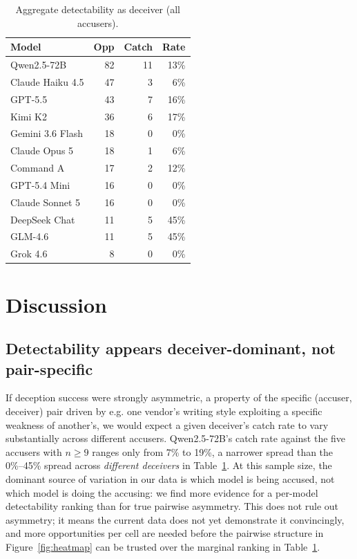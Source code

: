 \documentclass{article}
\begin{document}
\begin{table}[t]
\centering
\caption{Aggregate detectability as deceiver (all accusers).}
\label{tab:aggregate}
\begin{tabular}{@{}lrrr@{}}
\toprule
Model & Opp & Catch & Rate \\
\midrule
Qwen2.5-72B      & 82 & 11 & 13\% \\
Claude Haiku 4.5 & 47 & 3  & 6\%  \\
GPT-5.5          & 43 & 7  & 16\% \\
Kimi K2          & 36 & 6  & 17\% \\
Gemini 3.6 Flash & 18 & 0  & 0\%  \\
Claude Opus 5    & 18 & 1  & 6\%  \\
Command A        & 17 & 2  & 12\% \\
GPT-5.4 Mini     & 16 & 0  & 0\%  \\
Claude Sonnet 5  & 16 & 0  & 0\%  \\
DeepSeek Chat    & 11 & 5  & 45\% \\
GLM-4.6          & 11 & 5  & 45\% \\
Grok 4.6         & 8  & 0  & 0\%  \\
\bottomrule
\end{tabular}
\end{table}

\section{Discussion}
\label{sec:discussion}

\subsection{Detectability appears deceiver-dominant, not pair-specific}

If deception success were strongly asymmetric, a property of the specific (accuser, deceiver) pair driven by e.g. one vendor's writing style exploiting a specific weakness of another's, we would expect a given deceiver's catch rate to vary substantially across different accusers. Qwen2.5-72B's catch rate against the five accusers with $n{\geq}9$ ranges only from 7\% to 19\%, a narrower spread than the 0\%--45\% spread across \textit{different deceivers} in Table~\ref{tab:aggregate}. At this sample size, the dominant source of variation in our data is which model is being accused, not which model is doing the accusing: we find more evidence for a per-model detectability ranking than for true pairwise asymmetry. This does not rule out asymmetry; it means the current data does not yet demonstrate it convincingly, and more opportunities per cell are needed before the pairwise structure in Figure~\ref{fig:heatmap} can be trusted over the marginal ranking in Table~\ref{tab:aggregate}.
\end{document}
